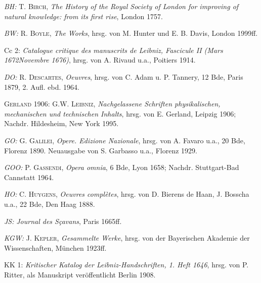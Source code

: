 \noindent\hangindent=10mm\textit{BH:} T. \textsc{Birch}, \textit{The History of the Royal Society of London for improving of natural knowledge: from its first rise}, London 1757.\par
%
\noindent\hangindent=10mm\textit{BW:} R. \textsc{Boyle}, \textit{The Works}, hrsg. von M. Hunter und E. B. Davis, London 1999ff.\par
%
\noindent\hangindent=10mm Cc 2: \textit{Catalogue critique des manuscrits de Leibniz, Fascicule  II (Mars 1672\textendash Novembre 1676)}, hrsg. von A. Rivaud u.a., Poitiers 1914.\par
%
\noindent\hangindent=10mm\textit{DO:} R. \textsc{Descartes}, \textit{Oeuvres}, hrsg. von C. Adam u. P. Tannery, 12 Bde, Paris 1879, 2. Aufl. ebd. 1964.\par
%
%
\noindent\hangindent=10mm\textsc{Gerland} 1906: G.W. \textsc{Leibniz}, \textit{Nachgelassene Schriften physikalischen, mechanischen und technischen Inhalts}, hrsg. von E. Gerland, Leipzig 1906; Nachdr. Hildesheim, New York 1995.\par
%
\noindent\hangindent=10mm\textit{GO:} G. \textsc{Galilei}, \textit{Opere. Edizione Nazionale}, hrsg. von A. Favaro u.a., 20 Bde, Florenz 1890. Neuausgabe von S. Garbasso u.a., Florenz 1929.\par
%
\noindent\hangindent=10mm\textit{GOO:} P. \textsc{Gassendi}, \textit{Opera omnia}, 6 Bde, Lyon 1658; Nachdr. Stuttgart-Bad Cannstatt 1964.\par
%
\noindent\hangindent=10mm\textit{HO:} C. \textsc{Huygens}, \textit{Oeuvres compl\`{e}tes}, hrsg. von D. Bierens de Haan, J. Bosscha u.a., 22 Bde, Den Haag 1888.\par
%
\noindent\hangindent=10mm\textit{JS:} \textit{Journal des S\c{c}avans}, Paris 1665ff.\par
%
\noindent\hangindent=10mm\textit{KGW:} J. \textsc{Kepler}, \textit{Gesammelte Werke}, hrsg. von der Bayerischen Akademie der Wissenschaften, M\"{u}nchen 1923ff.\par
%
\noindent\hangindent=10mm KK 1: \textit{Kritischer Katalog der Leibniz-Handschriften, 1. Heft 1646}, hrsg. von P. Ritter, als Manuskript ver\"{o}ffentlicht Berlin 1908.\par
